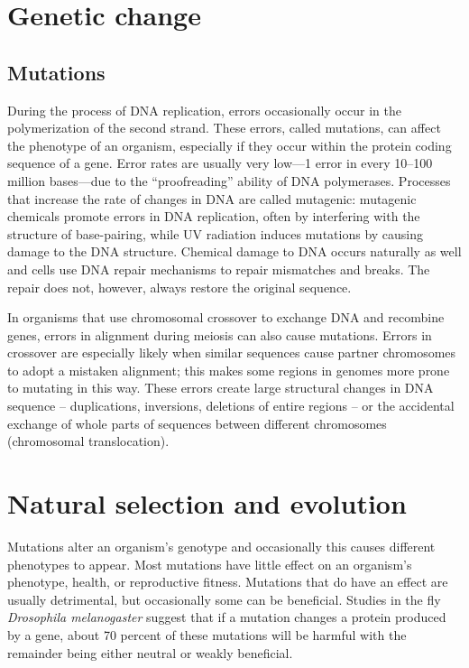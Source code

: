 \hypertarget{genetic-change}{%
\section{Genetic change}\label{genetic-change}}

\hypertarget{mutations}{%
\subsection{Mutations}\label{mutations}}

During the process of DNA replication, errors occasionally occur in the polymerization of the second strand. These errors, called mutations, can affect the phenotype of an organism, especially if they occur within the protein coding sequence of a gene. Error rates are usually very low---1 error in every 10--100 million bases---due to the ``proofreading'' ability of DNA polymerases. Processes that increase the rate of changes in DNA are called mutagenic: mutagenic chemicals promote errors in DNA replication, often by interfering with the structure of base-pairing, while UV radiation induces mutations by causing damage to the DNA structure. Chemical damage to DNA occurs naturally as well and cells use DNA repair mechanisms to repair mismatches and breaks. The repair does not, however, always restore the original sequence.

In organisms that use chromosomal crossover to exchange DNA and recombine genes, errors in alignment during meiosis can also cause mutations. Errors in crossover are especially likely when similar sequences cause partner chromosomes to adopt a mistaken alignment; this makes some regions in genomes more prone to mutating in this way. These errors create large structural changes in DNA sequence -- duplications, inversions, deletions of entire regions -- or the accidental exchange of whole parts of sequences between different chromosomes (chromosomal translocation).

\hypertarget{natural-selection-and-evolution}{%
\section{Natural selection and evolution}\label{natural-selection-and-evolution}}

Mutations alter an organism's genotype and occasionally this causes different phenotypes to appear. Most mutations have little effect on an organism's phenotype, health, or reproductive fitness. Mutations that do have an effect are usually detrimental, but occasionally some can be beneficial. Studies in the fly \emph{Drosophila melanogaster} suggest that if a mutation changes a protein produced by a gene, about 70 percent of these mutations will be harmful with the remainder being either neutral or weakly beneficial.


